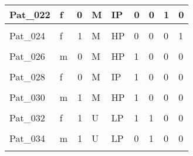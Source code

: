 \documentclass[11pt, a4paper, twosided]{book}
\begin{document}
\begin{longtable}[t]{l|l|r|l|l|l|l|l|l}
\hline
Pat\_022 & f & 0 & M & IP & 0 & 0 & 1 & 0\\
\hline
\cellcolor[HTML]{E2E868}{Pat\_023} & \cellcolor[HTML]{E2E868}{f} & \cellcolor[HTML]{E2E868}{0} & \cellcolor[HTML]{E2E868}{M} & \cellcolor[HTML]{E2E868}{HP} & \cellcolor[HTML]{E2E868}{0} & \cellcolor[HTML]{E2E868}{0} & \cellcolor[HTML]{E2E868}{0} & \cellcolor[HTML]{E2E868}{0}\\
\hline
Pat\_024 & f & 1 & M & HP & 0 & 0 & 0 & 1\\
\hline
\cellcolor[HTML]{E2E868}{Pat\_025} & \cellcolor[HTML]{E2E868}{m} & \cellcolor[HTML]{E2E868}{0} & \cellcolor[HTML]{E2E868}{M} & \cellcolor[HTML]{E2E868}{IP} & \cellcolor[HTML]{E2E868}{1} & \cellcolor[HTML]{E2E868}{0} & \cellcolor[HTML]{E2E868}{0} & \cellcolor[HTML]{E2E868}{0}\\
\hline
Pat\_026 & m & 0 & M & HP & 1 & 0 & 0 & 0\\
\hline
\cellcolor[HTML]{E2E868}{Pat\_027} & \cellcolor[HTML]{E2E868}{f} & \cellcolor[HTML]{E2E868}{0} & \cellcolor[HTML]{E2E868}{M} & \cellcolor[HTML]{E2E868}{HP} & \cellcolor[HTML]{E2E868}{1} & \cellcolor[HTML]{E2E868}{0} & \cellcolor[HTML]{E2E868}{0} & \cellcolor[HTML]{E2E868}{0}\\
\hline
Pat\_028 & f & 0 & M & IP & 1 & 0 & 0 & 0\\
\hline
\cellcolor[HTML]{E2E868}{Pat\_029} & \cellcolor[HTML]{E2E868}{f} & \cellcolor[HTML]{E2E868}{0} & \cellcolor[HTML]{E2E868}{M} & \cellcolor[HTML]{E2E868}{HP} & \cellcolor[HTML]{E2E868}{1} & \cellcolor[HTML]{E2E868}{0} & \cellcolor[HTML]{E2E868}{0} & \cellcolor[HTML]{E2E868}{0}\\
\hline
Pat\_030 & m & 1 & M & HP & 1 & 0 & 0 & 0\\
\hline
\cellcolor[HTML]{E2E868}{Pat\_031} & \cellcolor[HTML]{E2E868}{m} & \cellcolor[HTML]{E2E868}{0} & \cellcolor[HTML]{E2E868}{M} & \cellcolor[HTML]{E2E868}{HP} & \cellcolor[HTML]{E2E868}{0} & \cellcolor[HTML]{E2E868}{0} & \cellcolor[HTML]{E2E868}{0} & \cellcolor[HTML]{E2E868}{0}\\
\hline
Pat\_032 & f & 1 & U & LP & 1 & 1 & 0 & 0\\
\hline
\cellcolor[HTML]{E2E868}{Pat\_033} & \cellcolor[HTML]{E2E868}{m} & \cellcolor[HTML]{E2E868}{1} & \cellcolor[HTML]{E2E868}{U} & \cellcolor[HTML]{E2E868}{IP} & \cellcolor[HTML]{E2E868}{0} & \cellcolor[HTML]{E2E868}{1} & \cellcolor[HTML]{E2E868}{0} & \cellcolor[HTML]{E2E868}{0}\\
\hline
Pat\_034 & m & 1 & U & LP & 0 & 1 & 0 & 0\\
\hline
\cellcolor[HTML]{E2E868}{Pat\_035} & \cellcolor[HTML]{E2E868}{m} & \cellcolor[HTML]{E2E868}{0} & \cellcolor[HTML]{E2E868}{M} & \cellcolor[HTML]{E2E868}{HP} & \cellcolor[HTML]{E2E868}{1} & \cellcolor[HTML]{E2E868}{0} & \cellcolor[HTML]{E2E868}{0} & \cellcolor[HTML]{E2E868}{0}\\

\end{longtable}
\end{document}
